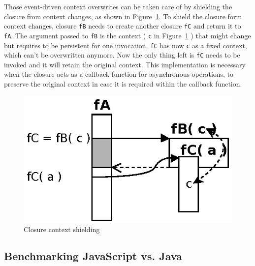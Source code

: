 Those event-driven context overwrites can be taken care of by shielding the closure from context changes, as shown in Figure~\ref{fig:Closures_Closure-3}.
To shield the closure form context changes, closure \texttt{fB} needs to create another closure \texttt{fC} and return it to \texttt{fA}.
The argument passed to \texttt{fB} is the context ( \texttt{c} in Figure~\ref{fig:Closures_Closure-3} ) that might change but requires to be persistent for one invocation.
\texttt{fC} has now \texttt{c} as a fixed context, which can't be overwritten anymore.
Now the only thing left is \texttt{fC} needs to be invoked and it will retain the original context.
This implementation is necessary when the closure acts as a callback function for asynchronous operations, to preserve the original context in case it is required within the callback function.
\begin{figure}[!ht]
	\centering
  \includegraphics{figures/Closures_Closure-3}
	\caption{Closure context shielding}
	\label{fig:Closures_Closure-3}
\end{figure}



\subsection{Benchmarking JavaScript vs. Java}

